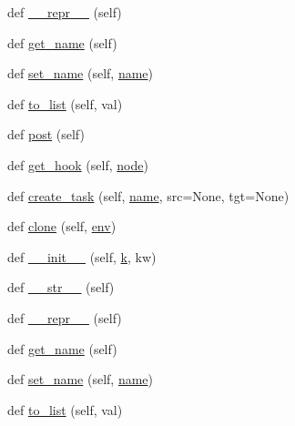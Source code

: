 \begin{DoxyCompactItemize}
\item 
def \hyperlink{classwaflib_1_1_task_gen_1_1task__gen_a040db536e5d7fe5054c9e9da52f36eb0}{\+\_\+\+\_\+repr\+\_\+\+\_\+} (self)
\item 
def \hyperlink{classwaflib_1_1_task_gen_1_1task__gen_a50370e76b549fc3bd0369c35f4fc1bab}{get\+\_\+name} (self)
\item 
def \hyperlink{classwaflib_1_1_task_gen_1_1task__gen_a79705c7a6b9b09021ee549e428c5a5c1}{set\+\_\+name} (self, \hyperlink{lib_2expat_8h_a1b49b495b59f9e73205b69ad1a2965b0}{name})
\item 
def \hyperlink{classwaflib_1_1_task_gen_1_1task__gen_a31a9f508654465cd5fe9f3baaaf77ec4}{to\+\_\+list} (self, val)
\item 
def \hyperlink{classwaflib_1_1_task_gen_1_1task__gen_aa00dedae17f7fa03c169f0e4bdab7414}{post} (self)
\item 
def \hyperlink{classwaflib_1_1_task_gen_1_1task__gen_a19b53157d4411479cf8f55e0ef0edfec}{get\+\_\+hook} (self, \hyperlink{structnode}{node})
\item 
def \hyperlink{classwaflib_1_1_task_gen_1_1task__gen_ad432ecefdf2362d1cccf1dad31fac2d3}{create\+\_\+task} (self, \hyperlink{lib_2expat_8h_a1b49b495b59f9e73205b69ad1a2965b0}{name}, src=None, tgt=None)
\item 
def \hyperlink{classwaflib_1_1_task_gen_1_1task__gen_a7b7e036b797a0532ce6be8df951ba048}{clone} (self, \hyperlink{classwaflib_1_1_task_gen_1_1task__gen_a4d6f968ce8718fdf77d46ea3b56def1e}{env})
\item 
def \hyperlink{classwaflib_1_1_task_gen_1_1task__gen_a17ba35bed2219481190d515ffef57404}{\+\_\+\+\_\+init\+\_\+\+\_\+} (self, \hyperlink{rfft2d_test_m_l_8m_adc468c70fb574ebd07287b38d0d0676d}{k}, kw)
\item 
def \hyperlink{classwaflib_1_1_task_gen_1_1task__gen_a48c763160308a6ff809b7048702618b1}{\+\_\+\+\_\+str\+\_\+\+\_\+} (self)
\item 
def \hyperlink{classwaflib_1_1_task_gen_1_1task__gen_a040db536e5d7fe5054c9e9da52f36eb0}{\+\_\+\+\_\+repr\+\_\+\+\_\+} (self)
\item 
def \hyperlink{classwaflib_1_1_task_gen_1_1task__gen_a50370e76b549fc3bd0369c35f4fc1bab}{get\+\_\+name} (self)
\item 
def \hyperlink{classwaflib_1_1_task_gen_1_1task__gen_a79705c7a6b9b09021ee549e428c5a5c1}{set\+\_\+name} (self, \hyperlink{lib_2expat_8h_a1b49b495b59f9e73205b69ad1a2965b0}{name})
\item 
def \hyperlink{classwaflib_1_1_task_gen_1_1task__gen_a31a9f508654465cd5fe9f3baaaf77ec4}{to\+\_\+list} (self, val)

\end{DoxyCompactItemize}
